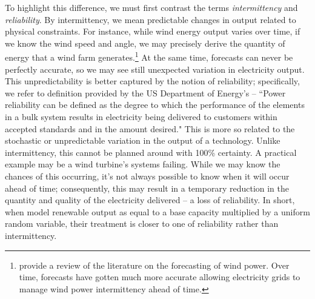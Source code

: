 \documentclass[11pt,a4paper,leqno]{extarticle}
\begin{document}
	
	To highlight this difference, we must first contrast the terms  \textit{intermittency} and \textit{reliability}. By intermittency, we mean predictable changes in output related to physical constraints. For instance, while wind energy output varies over time, if  we know the wind speed and angle, we may precisely derive the quantity of energy that a wind farm generates.\footnote{ \citet{Foley2012} provide a review of the literature on the forecasting of wind power. Over time, forecasts have gotten much more accurate allowing electricity grids to manage wind power intermittency ahead of time.}  At the same time, forecasts can never be perfectly accurate, so we may see still unexpected variation in  electricity output. This unpredictability is better captured by the notion of reliability; specifically,  we refer to definition provided by the US Department of Energy's \citet{ORNL} -- ``Power reliability can be defined as the degree to which the performance of the elements in a bulk system results in electricity being delivered to customers within accepted standards and in the amount desired." This is more so related to the stochastic or unpredictable variation in the output of a technology. Unlike intermittency, this cannot be planned around with 100\% certainty. A practical example may be a wind turbine's systems failing. While we may know the chances of this occurring, it's not always possible to know when it will occur ahead of time; consequently, this may result in a temporary reduction in the quantity and quality of the electricity delivered --  a loss of reliability. In short, when \citeauthor{HH} model renewable output as equal to a base capacity multiplied by a uniform random variable, their treatment is closer to one of reliability rather than intermittency. 
	
\end{document}
